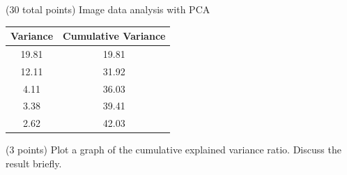 \documentclass[12pt]{article}
\begin{document}
\begin{question}{(30 total points) Image data analysis with PCA}
\begin{subquestion}
    \begin{answerbox}{15em}
      \begin{center}
			\begin{tabular}{ | c | c |} \hline
			Variance & Cumulative Variance \\ \hline
			19.81 & 19.81 \\ \hline
			12.11 & 31.92 \\ \hline
			4.11 & 36.03 \\ \hline
			3.38 & 39.41 \\ \hline
			2.62 & 42.03 \\ \hline
			\end{tabular}
		\end{center}
    \end{answerbox}
    


   \end{subquestion}

   \begin{subquestion}{(3 points)
       Plot a graph of the cumulative explained variance ratio.
       Discuss the result briefly.
     } \label{Q1.plot.pca.variance}
   

  



\end{subquestion}
\end{question}
\end{document}
